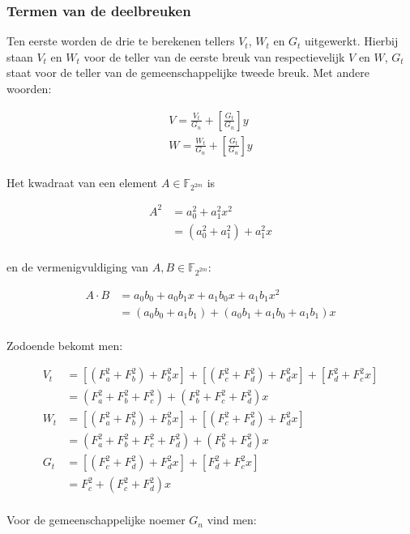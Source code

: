 \subsubsection{Termen van de deelbreuken}

Ten eerste worden de drie te berekenen tellers $V_t$, $W_t$ en $G_t$ uitgewerkt. Hierbij staan $V_t$ en $W_t$ voor de teller van de eerste breuk van respectievelijk $V$ en $W$, $G_t$ staat voor de teller van de gemeenschappelijke tweede breuk. Met andere woorden:

\[\begin{aligned}
V = \frac{V_t}{G_n} + \left[ \frac{G_t}{G_n} \right] y\\
W = \frac{W_t}{G_n} + \left[ \frac{G_t}{G_n} \right] y\\
\end{aligned}\]

Het kwadraat van een element $A \in \mathbb{F}_{2^{2m}}$ is

\[\begin{aligned}
A^2	&= a_0^2 + a_1^2 x^2\\
		&= (a_0^2 + a_1^2) + a_1^2 x\\
\end{aligned}\]

en de vermenigvuldiging van $A, B \in \mathbb{F}_{2^{2m}}$:

\[\begin{aligned}
A \cdot B	&= a_0 b_0 + a_0 b_1 x + a_1 b_0 x + a_1 b_1 x^2\\
				&= (a_0 b_0 + a_1 b_1) + (a_0 b_1 + a_1 b_0 + a_1 b_1)x\\
\end{aligned}\]

Zodoende bekomt men:

\[\begin{aligned}
V_t	&= [(F_a^2 + F_b^2) + F_b^2 x] + [(F_c^2 + F_d^2) + F_d^2x] + [F_d^2 + F_c^2x]\\
		&= (F_a^2 + F_b^2 + F_c^2) + (F_b^2 + F_c^2 + F_d^2)x\\
W_t	&= [(F_a^2 + F_b^2) + F_b^2 x] + [(F_c^2 + F_d^2) + F_d^2x]\\
		&= (F_a^2 + F_b^2 + F_c^2 + F_d^2) + (F_b^2 + F_d^2)x\\
G_t	&= [(F_c^2 + F_d^2) + F_d^2x] + [F_d^2 + F_c^2x]\\
		&= F_c^2 + (F_c^2 + F_d^2)x\\
\end{aligned}\]

Voor de gemeenschappelijke noemer $G_n$ vind men:

